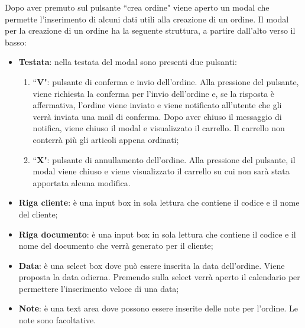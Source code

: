 Dopo aver premuto sul pulsante ``crea ordine" viene aperto un modal che permette l'inserimento di alcuni dati utili alla creazione di un ordine. Il modal per la creazione di un ordine ha la seguente struttura, a partire dall'alto verso il basso:
\begin{itemize}
	\item \textbf{Testata}: nella testata del modal sono presenti due pulsanti:
		\begin{enumerate}
			\item ``\textbf{V}": pulsante di conferma e invio dell'ordine. Alla pressione del pulsante, viene richiesta la conferma per l'invio dell'ordine e, se la risposta è affermativa, l'ordine viene inviato e viene notificato all'utente che gli verrà inviata una mail di conferma.
			Dopo aver chiuso il messaggio di notifica, viene chiuso il modal e visualizzato il carrello. Il carrello non conterrà più gli articoli appena ordinati;
			\item ``\textbf{X}": pulsante di annullamento dell'ordine. Alla pressione del pulsante, il modal viene chiuso e viene visualizzato il carrello su cui non sarà stata apportata alcuna modifica.
		\end{enumerate}
	\item \textbf{Riga cliente}: è una input box in sola lettura che contiene il codice e il nome del cliente;
	\item \textbf{Riga documento}: è una input box in sola lettura che contiene il codice e il nome del documento che verrà generato per il cliente;
	\item \textbf{Data}: è una select box dove può essere inserita la data dell'ordine. Viene proposta la data odierna. Premendo sulla select verrà aperto il calendario per permettere l'inserimento veloce di una data;
	\item \textbf{Note}: è una text area dove possono essere inserite delle note per l'ordine. Le note sono facoltative.
\end{itemize}

